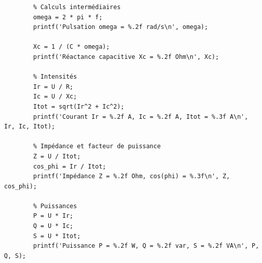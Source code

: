 \documentclass[a4paper,11pt,answers,addpoints]{exam}
\begin{document}
\begin{questions}
\begin{solution}
\begin{verbatim}
		% Calculs intermédiaires
		omega = 2 * pi * f;
		printf('Pulsation omega = %.2f rad/s\n', omega);
		
		Xc = 1 / (C * omega);
		printf('Réactance capacitive Xc = %.2f Ohm\n', Xc);
		
		% Intensités
		Ir = U / R;
		Ic = U / Xc;
		Itot = sqrt(Ir^2 + Ic^2);
		printf('Courant Ir = %.2f A, Ic = %.2f A, Itot = %.3f A\n', Ir, Ic, Itot);
		
		% Impédance et facteur de puissance
		Z = U / Itot;
		cos_phi = Ir / Itot;
		printf('Impédance Z = %.2f Ohm, cos(phi) = %.3f\n', Z, cos_phi);
		
		% Puissances
		P = U * Ir;
		Q = U * Ic;
		S = U * Itot;
		printf('Puissance P = %.2f W, Q = %.2f var, S = %.2f VA\n', P, Q, S);
	\end{verbatim}
\end{solution}

\end{questions}
\end{document}
